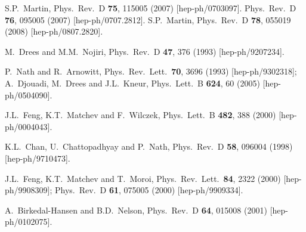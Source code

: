 \documentclass[12pt]{article}
\begin{document}
\begin{thebibliography}{999}
S.P.~Martin,
  Phys.\ Rev.\  D {\bf 75}, 115005 (2007)
  [hep-ph/0703097].
  Phys.\ Rev.\  D {\bf 76}, 095005 (2007)
  [hep-ph/0707.2812].
  S.P.~Martin,
  Phys.\ Rev.\  D {\bf 78}, 055019 (2008)
  [hep-ph/0807.2820].

M.~Drees and M.M.~Nojiri,
  Phys.\ Rev.\ D {\bf 47}, 376 (1993)
  [hep-ph/9207234].
  
P.~Nath and R.~Arnowitt,
  Phys.\ Rev.\ Lett.\  {\bf 70}, 3696 (1993)
  [hep-ph/9302318];
A.~Djouadi, M.~Drees and J.L.~Kneur,
  Phys.\ Lett.\ B {\bf 624}, 60 (2005)
  [hep-ph/0504090].
   
J.L.~Feng, K.T.~Matchev and F.~Wilczek,
  Phys.\ Lett.\ B {\bf 482}, 388 (2000)
  [hep-ph/0004043].

  K.L.~Chan, U.~Chattopadhyay and P.~Nath,
  Phys.\ Rev.\ D {\bf 58}, 096004 (1998)
  [hep-ph/9710473].

J.L.~Feng, K.T.~Matchev and T.~Moroi,
  Phys.\ Rev.\ Lett.\  {\bf 84}, 2322 (2000)
  [hep-ph/9908309];
  Phys.\ Rev.\ D {\bf 61}, 075005 (2000)
  [hep-ph/9909334].

A.~Birkedal-Hansen and B.D.~Nelson,
  Phys.\ Rev.\ D {\bf 64}, 015008 (2001)
  [hep-ph/0102075].


\end{thebibliography}
\end{document}
